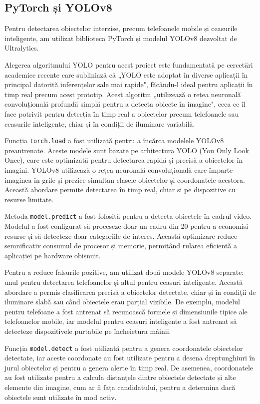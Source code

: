 \documentclass[12pt,a4paper]{article}
\begin{document}
\subsection{PyTorch și YOLOv8}
Pentru detectarea obiectelor interzise, precum telefoanele mobile și ceasurile inteligente, am utilizat biblioteca PyTorch\cite{pytorch} și modelul YOLOv8 dezvoltat de Ultralytics\cite{ultralytics}. 

Alegerea algoritmului YOLO pentru acest proiect este fundamentată pe cercetări academice recente care 
subliniază că „YOLO este adoptat în diverse aplicații în principal datorită inferențelor sale mai 
rapide"\cite{wang2022object}, făcându-l ideal pentru aplicații în timp real precum acest prototip. 
Acest algoritm „utilizează o rețea neuronală convoluțională profundă simplă pentru a detecta obiecte 
în imagine"\cite{v7labs2023yolo}, ceea ce îl face potrivit pentru detecția în timp real a obiectelor precum 
telefoanele sau ceasurile inteligente, chiar și în condiții de iluminare variabilă.

Funcția \texttt{torch.load} a fost utilizată pentru a încărca modelele YOLOv8 preantrenate. Aceste modele sunt bazate pe arhitectura YOLO (You Only Look Once), care este optimizată pentru detectarea rapidă și precisă a obiectelor în imagini\cite{redmon2018yolov3}. YOLOv8 utilizează o rețea neuronală convoluțională care împarte imaginea în grile și prezice simultan clasele obiectelor și coordonatele acestora. Această abordare permite detectarea în timp real, chiar și pe dispozitive cu resurse limitate.

Metoda \texttt{model.predict} a fost folosită pentru a detecta obiectele în cadrul video. Modelul a fost configurat să proceseze doar un cadru din 20 pentru a economisi resurse și să detecteze doar categoriile de interes. Această optimizare reduce semnificativ consumul de procesor și memorie, permițând rularea eficientă a aplicației pe hardware obișnuit.

Pentru a reduce falsurile pozitive, am utilizat două modele YOLOv8 separate: unul pentru detectarea telefoanelor și altul pentru ceasuri inteligente. Această abordare a permis clasificarea precisă a obiectelor detectate, chiar și în condiții de iluminare slabă sau când obiectele erau parțial vizibile. De exemplu, modelul pentru telefoane a fost antrenat să recunoască formele și dimensiunile tipice ale telefoanelor mobile, iar modelul pentru ceasuri inteligente a fost antrenat să detecteze dispozitivele purtabile pe încheietura mâinii.

Funcția \texttt{model.detect} a fost utilizată pentru a genera coordonatele obiectelor detectate, iar aceste coordonate au fost utilizate pentru a desena dreptunghiuri în jurul obiectelor și pentru a genera alerte în timp real. De asemenea, coordonatele au fost utilizate pentru a calcula distanțele dintre obiectele detectate și alte elemente din imagine, cum ar fi fața candidatului, pentru a determina dacă obiectele sunt utilizate în mod activ.
\end{document}
